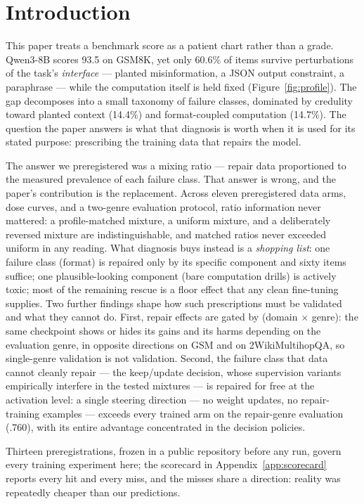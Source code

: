 \section{Introduction}
\label{sec:intro}

This paper treats a benchmark score as a patient chart rather than a grade.
Qwen3-8B scores 93.5 on GSM8K, yet only 60.6\% of items survive perturbations
of the task's \emph{interface} --- planted misinformation, a JSON output
constraint, a paraphrase --- while the computation itself is held fixed
(Figure~\ref{fig:profile}). The gap decomposes into a small taxonomy of
failure classes, dominated by credulity toward planted context (14.4\%) and
format-coupled computation (14.7\%). The question the paper answers is what
that diagnosis is worth when it is used for its stated purpose: prescribing
the training data that repairs the model.

The answer we preregistered was a mixing ratio --- repair data proportioned to
the measured prevalence of each failure class. That answer is wrong, and the
paper's contribution is the replacement. Across eleven preregistered data
arms, dose curves, and a two-genre evaluation protocol, ratio information
never mattered: a profile-matched mixture, a uniform mixture, and a
deliberately reversed mixture are indistinguishable, and matched ratios never
exceeded uniform in any reading. What diagnosis buys instead is a
\emph{shopping list}: one failure class (format) is repaired only by its
specific component and sixty items suffice; one plausible-looking component
(bare computation drills) is actively toxic; most of the remaining rescue is a
floor effect that any clean fine-tuning supplies. Two further findings shape
how such prescriptions must be validated and what they cannot do. First,
repair effects are gated by (domain $\times$ genre): the same checkpoint shows
or hides its gains and its harms depending on the evaluation genre, in
opposite directions on GSM and on 2WikiMultihopQA, so single-genre validation
is not validation. Second, the failure class that data cannot cleanly repair
--- the keep/update decision, whose supervision variants empirically
interfere in the tested mixtures --- is repaired for free at the activation
level: a single steering direction --- no weight updates, no repair-training examples --- exceeds every trained
arm on the repair-genre evaluation (.760), with its entire advantage
concentrated in the decision policies.

Thirteen preregistrations, frozen in a public repository before any run,
govern every training experiment here; the scorecard in
Appendix~\ref{app:scorecard} reports every hit and every miss, and the misses
share a direction: reality was repeatedly cheaper than our predictions.
